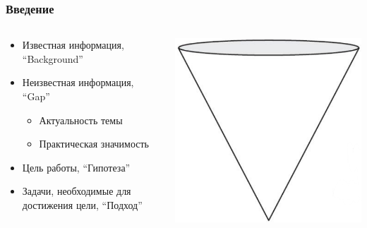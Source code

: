 \documentclass[xetex,mathserif,serif]{beamer}
\begin{document}
	\begin{frame}
		\frametitle{Введение}
		\begin{columns}
			\begin{column}{0.6\textwidth}
				\begin{itemize}
					\item Известная информация, ``Background''
					\item Неизвестная информация, ``Gap''
					\begin{itemize}
						\item Актуальность темы
						\item Практическая значимость
					\end{itemize}
					\item Цель работы, ``Гипотеза'' 
					\item Задачи, необходимые для достижения цели, ``Подход''
				\end{itemize}
			\end{column}
			\begin{column}{0.4\textwidth}
				\begin{center}
					\includegraphics[width=\textwidth]{introductionCone.png}
				\end{center}
			\end{column}
		\end{columns}
	\end{frame}
\end{document}

